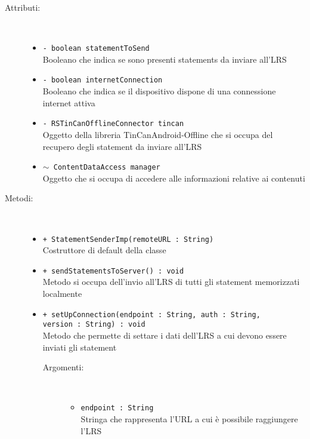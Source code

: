 \documentclass[../Tesi.tex]{subfiles}
\begin{document}
		\begin{description}
			\item[Attributi:] \
			\begin{itemize}
				\item \texttt{- boolean statementToSend}\\
				Booleano che indica se sono presenti statements da inviare all'LRS

				\item \texttt{- boolean internetConnection}\\
				Booleano che indica se il dispositivo dispone di una connessione internet attiva

				\item \texttt{- RSTinCanOfflineConnector tincan}\\
				Oggetto della libreria TinCanAndroid-Offline che si occupa del recupero degli statement da inviare all'LRS

				\item \texttt{$\sim$ ContentDataAccess manager}\\
				Oggetto che si occupa di accedere alle informazioni relative ai contenuti

			\end{itemize}

			\item[Metodi:] \
			\begin{itemize}
				\item \texttt{+ StatementSenderImp(remoteURL : String)}\\
				Costruttore di default della classe 
				
				\item \texttt{+ sendStatementsToServer() : void}\\
				Metodo si occupa dell'invio all'LRS di tutti gli statement memorizzati localmente

				\item \texttt{+ setUpConnection(endpoint : String, auth : String, \\version : String) : void}\\
				Metodo che permette di settare i dati dell'LRS a cui devono essere inviati gli statement
				\begin{description}
					\item[Argomenti:] \
					\begin{itemize}
						\item \texttt{endpoint : String}\\
						Stringa che rappresenta l'URL a cui è possibile raggiungere l'LRS


\end{itemize}
\end{description}
\end{itemize}
\end{description}
\end{document}
